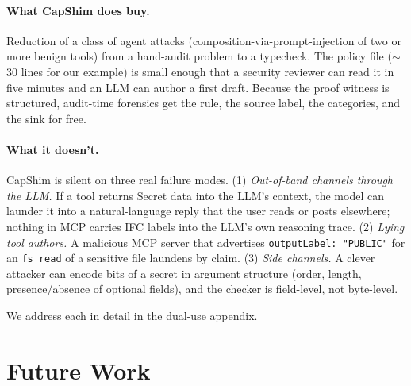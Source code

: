 \documentclass[11pt,a4paper]{article}
\begin{document}
\paragraph{What CapShim does buy.} Reduction of a class of agent
attacks (composition-via-prompt-injection of two or more benign
tools) from a hand-audit problem to a typecheck. The policy file
($\sim$30 lines for our example) is small enough that a security
reviewer can read it in five minutes and an LLM can author a first
draft. Because the proof witness is structured, audit-time
forensics get the rule, the source label, the categories, and the
sink for free.

\paragraph{What it doesn't.} CapShim is silent on three real
failure modes. (1) \emph{Out-of-band channels through the LLM.}
If a tool returns Secret data into the LLM's context, the model can
launder it into a natural-language reply that the user reads or
posts elsewhere; nothing in MCP carries IFC labels into the LLM's
own reasoning trace. (2) \emph{Lying tool authors.} A malicious MCP
server that advertises \texttt{outputLabel: "PUBLIC"} for an
\texttt{fs\_read} of a sensitive file laundens by claim. (3)
\emph{Side channels.} A clever attacker can encode bits of a secret
in argument structure (order, length, presence/absence of optional
fields), and the checker is field-level, not byte-level.

We address each in detail in the dual-use appendix.

\section{Future Work}\label{sec:future}
\end{document}
